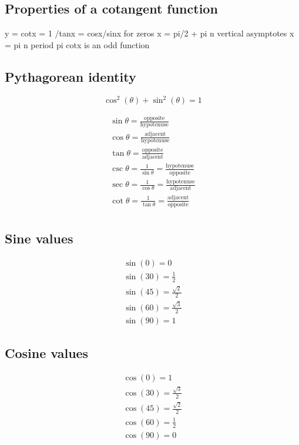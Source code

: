 \documentclass{article}
\begin{document}
\subsection{Properties of a cotangent function}
y = cotx = 1 /tanx = cosx/sinx
for zeros x = pi/2 + pi n
vertical asymptotes x = pi n
period pi
cotx is an odd function

\subsection{Pythagorean identity}
\begin{equation}
  \cos^2(\theta) + \sin^2(\theta) = 1
\end{equation}

\begin{equation}
  \begin{gathered}
    \sin\theta = \frac{\text{opposite}}{\text{hypotenuse}} \\
    \cos\theta = \frac{\text{adjacent}}{\text{hypotenuse}} \\
    \tan\theta = \frac{\text{opposite}}{\text{adjacent}} \\
    \csc\theta = \frac{1}{\sin{\theta}} =
    \frac{\text{hypotenuse}}{\text{opposite}} \\
    \sec\theta = \frac{1}{\cos{\theta}} =
    \frac{\text{hypotenuse}}{\text{adjacent}} \\
    \cot\theta = \frac{1}{\tan{\theta}} =
    \frac{\text{adjacent}}{\text{opposite}} \\
  \end{gathered}
\end{equation}

\subsection{Sine values}
\begin{equation}
  \begin{gathered}
    \sin(0) = 0 \\
    \sin(30) = \frac{1}{2} \\
    \sin(45) = \frac{\sqrt{2}}{2} \\
    \sin(60) = \frac{\sqrt{3}}{2} \\
    \sin(90) = 1
  \end{gathered}
\end{equation}

\subsection{Cosine values}
\begin{equation}
  \begin{gathered}
    \cos(0) = 1 \\
    \cos(30) = \frac{\sqrt{3}}{2} \\
    \cos(45) = \frac{\sqrt{2}}{2} \\
    \cos(60) = \frac{1}{2} \\
    \cos(90) = 0
  \end{gathered}
\end{equation}
\end{document}
